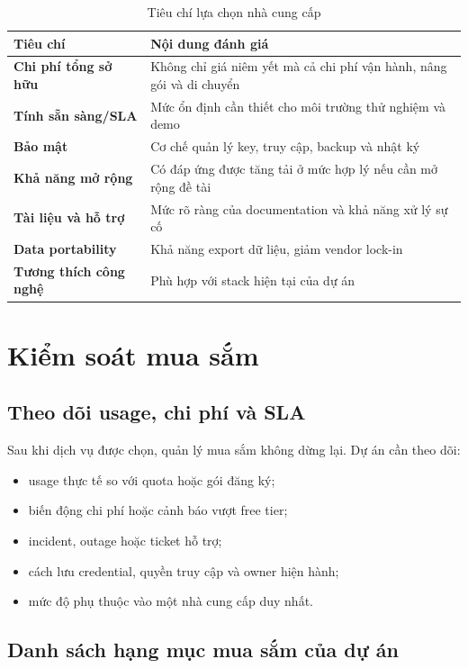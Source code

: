 \begin{table}[H]
\centering
\caption{Tiêu chí lựa chọn nhà cung cấp}
\label{tab:vendor-selection-criteria}
\begin{tabularx}{\textwidth}{| >{\bfseries}p{4cm} | X |}
\hline
Tiêu chí & Nội dung đánh giá \\
\hline
Chi phí tổng sở hữu & Không chỉ giá niêm yết mà cả chi phí vận hành, nâng gói và di chuyển \\ \hline
Tính sẵn sàng/SLA & Mức ổn định cần thiết cho môi trường thử nghiệm và demo \\ \hline
Bảo mật & Cơ chế quản lý key, truy cập, backup và nhật ký \\ \hline
Khả năng mở rộng & Có đáp ứng được tăng tải ở mức hợp lý nếu cần mở rộng đề tài \\ \hline
Tài liệu và hỗ trợ & Mức rõ ràng của documentation và khả năng xử lý sự cố \\ \hline
Data portability & Khả năng export dữ liệu, giảm vendor lock-in \\ \hline
Tương thích công nghệ & Phù hợp với stack hiện tại của dự án \\
\hline
\end{tabularx}
\end{table}

\fi
\section{Kiểm soát mua sắm}

\subsection{Theo dõi usage, chi phí và SLA}

Sau khi dịch vụ được chọn, quản lý mua sắm không dừng lại. Dự án cần theo dõi:

\begin{itemize}
  \item usage thực tế so với quota hoặc gói đăng ký;
  \item biến động chi phí hoặc cảnh báo vượt free tier;
  \item incident, outage hoặc ticket hỗ trợ;
  \item cách lưu credential, quyền truy cập và owner hiện hành;
  \item mức độ phụ thuộc vào một nhà cung cấp duy nhất.
\end{itemize}

\subsection{Danh sách hạng mục mua sắm của dự án}

